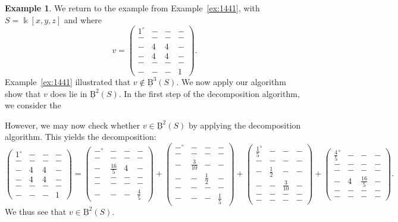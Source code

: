 \documentclass[12pt]{amsart}
\theoremstyle{definition}
\newtheorem{example}[lemma]{Example}
\theoremstyle{remark}
\newcommand{\kk}{\Bbbk}
\newcommand{\zp}{\circ}
\newcommand{\BBQ}{\underline{\mathrm{B}}}
\begin{document}
\begin{example}\label{ex:1441 redux}
We return to the example from Example~\ref{ex:1441}, with $S=\kk[x,y,z]$ and where
\[
v=\begin{pmatrix} 1^\zp&-&-&-\\ -&-&-&-\\-&4&4&-\\-&4&4&-\\-&-&-&-\\-&-&-&1 \end{pmatrix}.
\]
Example~\ref{ex:1441} illustrated that $v\notin \BBQ^3(S)$.  We now apply our algorithm show that $v$ does lie in $\BBQ^2(S)$.  In the first step of the decomposition algorithm, we consider the


However, we may now check whether $v\in \BBQ^2(S)$ by applying the decomposition algorithm.  This yields the decomposition:
\[
\begin{pmatrix} 1^\zp&-&-&-\\ -&-&-&-\\-&4&4&-\\-&4&4&-\\-&-&-&-\\-&-&-&1 \end{pmatrix}
=
\begin{pmatrix} -^\zp&-&-&-\\ -&-&-&-\\-&\frac{16}{5}&4&-\\-&-&-&-\\-&-&-&-\\-&-&-&\frac{4}{5} \end{pmatrix}
+
\begin{pmatrix} -^\zp&-&-&-\\ -&-&-&-\\-&\frac{3}{10}&-&-\\-&-&\frac{1}{2}&-\\-&-&-&-\\-&-&-&\frac{1}{5} \end{pmatrix}
+
\begin{pmatrix} \frac{1}{5}^\zp&-&-&-\\ -&-&-&-\\-&\frac{1}{2}&-&-\\-&-&\frac{3}{10}&-\\-&-&-&-\\-&-&-&- \end{pmatrix}
+
\begin{pmatrix} \frac{4}{5}^\zp&-&-&-\\ -&-&-&-\\-&-&-&-\\-&4&\frac{16}{5}&-\\-&-&-&-\\-&-&-&- \end{pmatrix}.
\]
We thus see that $v\in \BBQ^2(S)$.
\end{example}
\end{document}
